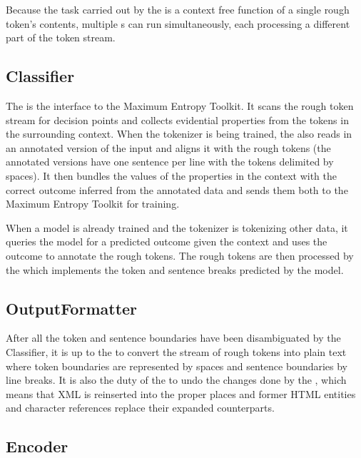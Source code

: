 Because the task carried out by the  is a context free
function of a single rough token's contents, multiple s
can run simultaneously, each processing a different part of the token stream.

\subsection{Classifier}
\label{ssec:impl-overview-classifier}

The  is the interface to the Maximum Entropy Toolkit. It
scans the rough token stream for decision points and collects evidential
properties from the tokens in the surrounding context. When the tokenizer is
being trained, the  also reads in an annotated version of the
input and aligns it with the rough tokens (the annotated versions have one
sentence per line with the tokens delimited by spaces). It then bundles the
values of the properties in the context with the correct outcome inferred from
the annotated data and sends them both to the Maximum Entropy Toolkit for
training.

When a model is already trained and the tokenizer is tokenizing other data, it
queries the model for a predicted outcome given the context and uses the
outcome to annotate the rough tokens. The rough tokens are then processed by
the  which implements the token and sentence breaks
predicted by the model.

\subsection{OutputFormatter}
\label{ssec:impl-overview-outputformatter}

After all the token and sentence boundaries have been disambiguated by the
Classifier, it is up to the  to convert the stream of
rough tokens into plain text where token boundaries are represented by spaces
and sentence boundaries by line breaks. It is also the duty of the
 to undo the changes done by the ,
which means that XML is reinserted into the proper places and former HTML
entities and character references replace their expanded counterparts.

\subsection{Encoder}
\label{ssec:impl-overview-encoder}

